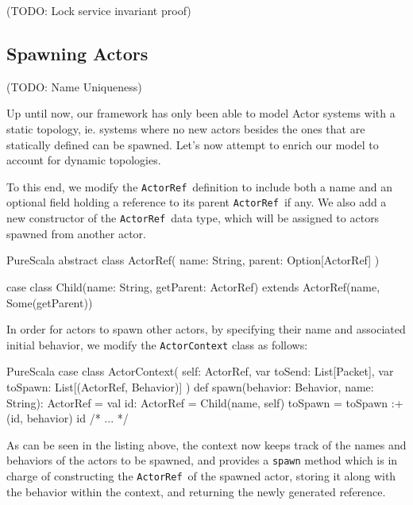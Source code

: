 \documentclass[a4paper,twoside]{article}
\newcommand{\InlineS}[1]{\lstinline[language=PureScala,basicstyle=\small\ttfamily,columns=fixed]|#1|}
\newcommand{\TODO}[1]{\textcolor{YellowOrange}{(TODO: #1)}} %
\newcommand{\ActorRef}{\InlineS{ActorRef}\ }
\newcommand{\stt}[1]{\texttt{\small{#1}}}
\begin{document}
\TODO{Lock service invariant proof}

%

%

\subsection{Spawning Actors}
\label{spawn}

\TODO{Name Uniqueness}

Up until now, our framework has only been able to model Actor systems with a static topology, ie. systems where no new actors besides the ones that are statically defined can be spawned. Let's now attempt to enrich our model to account for dynamic topologies.

To this end, we modify the \ActorRef definition to include both a name and an optional field holding a reference to its parent \ActorRef if any. We also add a new constructor of the \ActorRef data type, which will be assigned to actors spawned from another actor.

\begin{ShortCode}{PureScala}
abstract class ActorRef(
  name: String,
  parent: Option[ActorRef]
)

case class Child(name: String, getParent: ActorRef)
  extends ActorRef(name, Some(getParent))
\end{ShortCode}

In order for actors to spawn other actors, by specifying their name and associated 
initial behavior, we modify the \stt{ActorContext} class as follows:

\begin{ShortCode}{PureScala}
case class ActorContext(
  self: ActorRef,
  var toSend: List[Packet],
  var toSpawn: List[(ActorRef, Behavior)]
) {
  def spawn(behavior: Behavior, name: String): ActorRef = {
    val id: ActorRef = Child(name, self)
    toSpawn = toSpawn :+ (id, behavior)
    id
  }
  /* ... */
}
\end{ShortCode}

As can be seen in the listing above, the context now keeps track of the names and 
behaviors of the actors to be spawned, and provides a \stt{spawn} method which is in 
charge of constructing the \ActorRef of the spawned actor, storing it along with the 
behavior within the context, and returning the newly generated reference.\\
\end{document}
